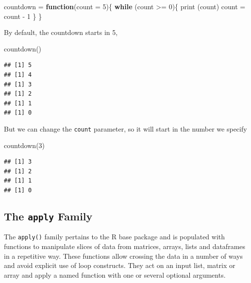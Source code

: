 \documentclass[
]{book}
\newenvironment{Shaded}{\begin{snugshade}}{\end{snugshade}}
\newcommand{\AttributeTok}[1]{\textcolor[rgb]{0.77,0.63,0.00}{#1}}
\newcommand{\ControlFlowTok}[1]{\textcolor[rgb]{0.13,0.29,0.53}{\textbf{#1}}}
\newcommand{\DecValTok}[1]{\textcolor[rgb]{0.00,0.00,0.81}{#1}}
\newcommand{\FunctionTok}[1]{\textcolor[rgb]{0.00,0.00,0.00}{#1}}
\newcommand{\NormalTok}[1]{#1}
\newcommand{\OtherTok}[1]{\textcolor[rgb]{0.56,0.35,0.01}{#1}}
\newcommand{\SpecialCharTok}[1]{\textcolor[rgb]{0.00,0.00,0.00}{#1}}
\begin{document}
\begin{Shaded}
\begin{Highlighting}[]
\NormalTok{countdown }\OtherTok{=} \ControlFlowTok{function}\NormalTok{(}\AttributeTok{count =} \DecValTok{5}\NormalTok{)\{}
  \ControlFlowTok{while}\NormalTok{ (count }\SpecialCharTok{\textgreater{}=} \DecValTok{0}\NormalTok{)\{}
    \FunctionTok{print}\NormalTok{ (count)}
\NormalTok{    count }\OtherTok{=}\NormalTok{ count }\SpecialCharTok{{-}} \DecValTok{1}
\NormalTok{  \}}
\NormalTok{\}}
\end{Highlighting}
\end{Shaded}

By default, the countdown starts in 5,

\begin{Shaded}
\begin{Highlighting}[]
\FunctionTok{countdown}\NormalTok{()}
\end{Highlighting}
\end{Shaded}

\begin{verbatim}
## [1] 5
## [1] 4
## [1] 3
## [1] 2
## [1] 1
## [1] 0
\end{verbatim}

But we can change the \texttt{count} parameter, so it will start in the number we specify

\begin{Shaded}
\begin{Highlighting}[]
\FunctionTok{countdown}\NormalTok{(}\DecValTok{3}\NormalTok{)}
\end{Highlighting}
\end{Shaded}

\begin{verbatim}
## [1] 3
## [1] 2
## [1] 1
## [1] 0
\end{verbatim}

\hypertarget{the-apply-family}{%
\subsection{\texorpdfstring{The \texttt{apply} Family}{The apply Family}}\label{the-apply-family}}

The \texttt{apply()} family pertains to the R base package and is populated with functions to manipulate slices of data from matrices, arrays, lists and dataframes in a repetitive way. These functions allow crossing the data in a number of ways and avoid explicit use of loop constructs. They act on an input list, matrix or array and apply a named function with one or several optional arguments.
\end{document}

